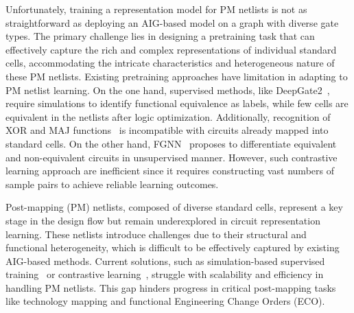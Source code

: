 Unfortunately, training a representation model for PM netlists is not as straightforward as deploying an AIG-based model on a graph with diverse gate types. The primary challenge lies in designing a pretraining task that can effectively capture the rich and complex representations of individual standard cells, accommodating the intricate characteristics and heterogeneous nature of these PM netlists. Existing pretraining approaches have limitation in adapting to PM netlist learning. On the one hand, supervised methods, like DeepGate2~\cite{shi2023deepgate2}, require simulations to identify functional equivalence as labels, while few cells are equivalent in the netlists after logic optimization. Additionally, recognition of XOR and MAJ functions~\cite{wu2023gamora} is incompatible with circuits already mapped into standard cells. On the other hand, FGNN~\cite{wang2022functionality} proposes to differentiate equivalent and non-equivalent circuits in unsupervised manner. However, such contrastive learning approach are inefficient since it requires constructing vast numbers of sample pairs to achieve reliable learning outcomes. 
\fi 

Post-mapping (PM) netlists, composed of diverse standard cells, represent a key stage in the design flow but remain underexplored in circuit representation learning. These netlists introduce challenges due to their structural and functional heterogeneity, which is difficult to be effectively captured by existing AIG-based methods. Current solutions, such as simulation-based supervised training~\cite{shi2023deepgate2} or contrastive learning~\cite{wang2022functionality}, struggle with scalability and efficiency in handling PM netlists. This gap hinders progress in critical post-mapping tasks like technology mapping and functional Engineering Change Orders (ECO).



